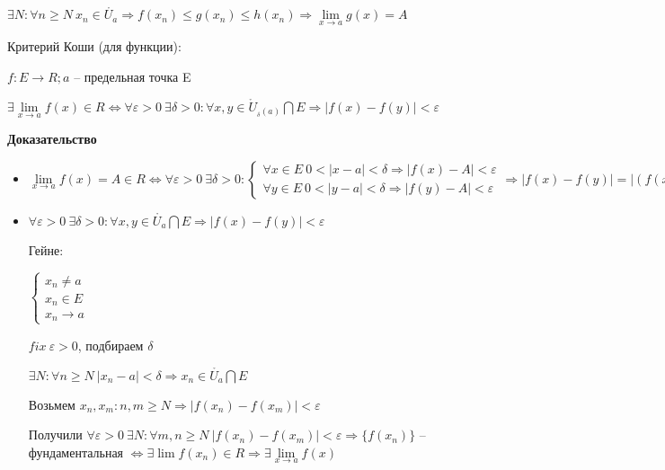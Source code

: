 \documentclass[14pt, letter paper]{article}
\begin{document}
$\exists N : \forall n \geq N\ x_n \in \mathring{U_a} \Rightarrow f(x_n) \leq g(x_n) \leq h(x_n) \Rightarrow \lim\limits_{x \rightarrow a}{g(x)} = A$

\vspace{5mm}

Критерий Коши (для функции):

$f : E \rightarrow R; a$ -- предельная точка E

$\exists \lim\limits_{x \rightarrow a}{f(x)} \in R \Leftrightarrow \forall \varepsilon > 0\ \exists \delta > 0 : \forall x, y \in \mathring{U}_{_\delta (a)} \bigcap E \Rightarrow |f(x) - f(y)| < \varepsilon$

\begin{center}
    \textbf{Доказательство}
\end{center}

\begin{itemize}
    \item[$\Rightarrow$] $\lim\limits_{x \rightarrow a}{f(x)} = A \in R \Leftrightarrow \forall \varepsilon > 0\ \exists \delta > 0 : \begin{cases}
        \forall x \in E\ 0 < |x - a| < \delta \Rightarrow |f(x) - A| < \varepsilon \\
        \forall y \in E\ 0 < |y - a| < \delta \Rightarrow |f(y) - A| < \varepsilon
    \end{cases} \Rightarrow |f(x) - f(y)| = |(f(x) - A) + (A - f(y))| \leq |f(x) - A| + |f(y) - A| < \varepsilon + \varepsilon = 2 \varepsilon$

    \item[$\Leftarrow$] $\forall \varepsilon > 0\ \exists \delta > 0 : \forall x, y \in \mathring{U_a} \bigcap E \Rightarrow |f(x) - f(y)| < \varepsilon$

    Гейне:

    $\begin{cases}
        x_n \neq a \\
        x_n \in E \\
        x_n \rightarrow a
    \end{cases}$

    $fix\ \varepsilon > 0$, подбираем $\delta$

    $\exists N : \forall n \geq N\ |x_n - a| < \delta \Rightarrow x_n \in \mathring{U_a} \bigcap E$

    Возьмем $x_n, x_m : n, m \geq N \Rightarrow |f(x_n) - f(x_m)| < \varepsilon$

    Получили $\forall \varepsilon > 0\ \exists N : \forall m, n \geq N\ |f(x_n) - f(x_m)| < \varepsilon \Rightarrow \{f(x_n)\}$ -- фундаментальная $\Leftrightarrow \exists \lim{f(x_n)} \in R \Rightarrow \exists \lim\limits_{x \rightarrow a}{f(x)}$
\end{itemize}
\end{document}
